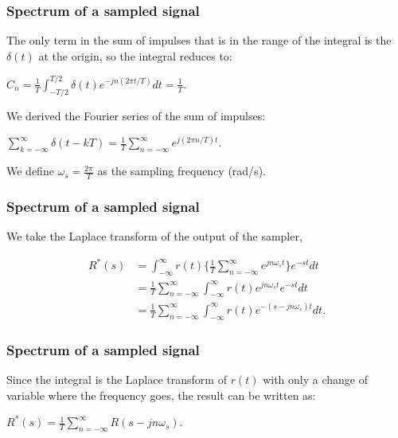 \begin{frame}
	\frametitle{Spectrum of a sampled signal}
	The only term in the sum of impulses that is in the range of the integral is the $\delta(t)$ at the origin, so the integral reduces to: \\
	\begin{center}
		$C_n=\frac{1}{T}\int_{-T/2}^{T/2}\delta(t)e^{-jn(2\pi t/T)}dt=\frac{1}{T}$.
	\end{center}
	We derived the Fourier series of the sum of impulses:\\
	\begin{center}
		$\sum_{k=-\infty}^{\infty} \delta(t-kT)=\frac{1}{T}\sum_{n=-\infty}^{\infty} e^{j(2\pi n/T)t}$.
	\end{center}
	We define $\omega_s = \frac{2\pi}{T}$ as the sampling frequency (rad/s).\\
\end{frame}

\begin{frame}
	\frametitle{Spectrum of a sampled signal}
	We take the Laplace transform of the output of the sampler,
	\vspace{-1em}
	\begin{center}
		\begin{equation}
			\begin{split}
			R^*(s)& = \int_{-\infty}^{\infty} r(t) \Big\{ \frac{1}{T} \sum_{n=-\infty}^{\infty} e^{jn\omega_st} \Big\} e^{-st} dt\\
			& = \frac{1}{T} \sum_{n=-\infty}^{\infty} \int_{-\infty}^{\infty} r(t) e^{jn\omega_st}e^{-st}dt\\
			& = \frac{1}{T} \sum_{n=-\infty}^{\infty} \int_{-\infty}^{\infty}r(t) e^{-(s-jn\omega_s)t} dt.
			\end{split}
		\end{equation}
	\end{center}
\end{frame}

\begin{frame}
	\frametitle{Spectrum of a sampled signal}
	\begin{definition}
	Since the integral is the Laplace transform of $r(t)$ with only a change of variable where the frequency goes, the result can be written as:\\
	\begin{center}
		$R^*(s)=\frac{1}{T}\sum_{n=-\infty}^{\infty}R(s-jn\omega_s)$.
	\end{center}
	\end{definition}
\end{frame}

